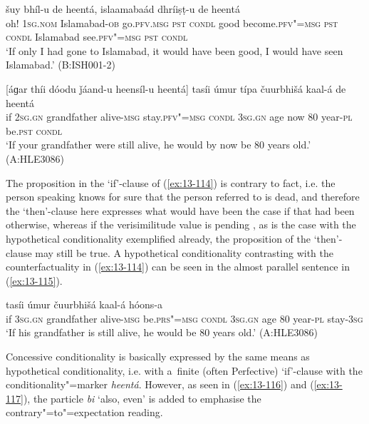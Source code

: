 \begin{exe}
\ex
\label{ex:13-113}
 šuy bhíl-u de heentá,
islaamabaád  dhríiṣṭ-u de heentá \\
oh! \textsc{1sg.nom} Islamabad-\textsc{ob} go.\textsc{pfv.msg} \textsc{pst}  \textsc{condl} good become.\textsc{pfv"=msg} \textsc{pst} \textsc{condl} Islamabad see.\textsc{pfv"=msg} \textsc{pst} \textsc{condl} \\
\glt `If only I had gone to Islamabad, it would have been good, I would have seen Islamabad.' (B:ISH001-2)

\ex
\label{ex:13-114}
\gll \label{bkm:Ref190830564}[áɡar thíi dóodu ǰáand-u heensíl-u  heentá]
tasíi úmur típa čuurbhišá kaal-á de  heentá \\
if \textsc{2sg.gn} grandfather alive-\textsc{msg} stay.\textsc{pfv"=msg}  \textsc{condl} 
\textsc{3sg.gn} age now 80 year-\textsc{pl} be.\textsc{pst} \textsc{condl} \\
\glt `If your grandfather were still alive, he would by now be 80 years old.' (A:HLE3086) 
\end{exe}

The proposition in the `if'-clause of (\ref{ex:13-114}) is contrary to fact, i.e. the person speaking knows for sure that the person referred to is dead, and therefore the `then'-clause here expresses what would have been the case if that had been otherwise, whereas if the verisimilitude value is pending \citep[332]{givon2001b}, as is the case with the hypothetical conditionality exemplified already, the proposition of the `then'-clause may still be true. A hypothetical conditionality contrasting with the counterfactuality in (\ref{ex:13-114}) can be seen in the almost parallel sentence in (\ref{ex:13-115}).

\begin{exe}
\ex
\label{ex:13-115}
 tasíi úmur čuurbhišá kaal-á hóons-a \\
if \textsc{3sg.gn} grandfather alive-\textsc{msg} be.\textsc{prs"=msg}  \textsc{condl} \textsc{3sg.gn} age 80 year-\textsc{pl} stay-\textsc{3sg} \\
\glt `If his grandfather is still alive, he would be 80 years old.' (A:HLE3086) 
\end{exe}

 Concessive conditionality is basically expressed by the same means as hypothetical conditionality, i.e. with a~finite (often Perfective) `if'-clause with the conditionality"=marker \textit{heentá}. However, as seen in (\ref{ex:13-116}) and (\ref{ex:13-117}), the particle \textit{bi} `also, even' is added to emphasise the contrary"=to"=expectation reading. 

